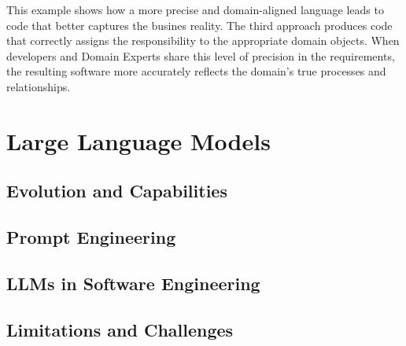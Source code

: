 This example shows how a more precise and domain-aligned language leads to code that better captures the busines reality. The third approach produces code that correctly assigns the responsibility to the appropriate domain objects. When developers and Domain Experts share this level of precision in the requirements, the resulting software more accurately reflects the domain's true processes and relationships.

\section{Large Language Models}
\subsection{Evolution and Capabilities}
\subsection{Prompt Engineering}
\subsection{LLMs in Software Engineering}
\subsection{Limitations and Challenges}